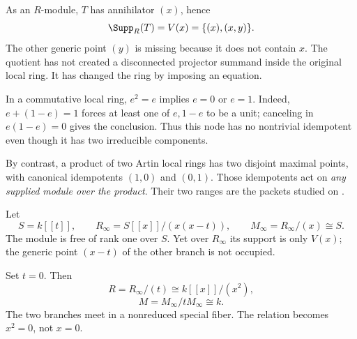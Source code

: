 As an $R$-module, $T$ has annihilator $(x)$, hence
\[
\Supp_R(T)=V(x)=\{(x),(x,y)\}.
\]
The other generic point $(y)$ is missing because it does not contain $x$. The quotient has not created a disconnected projector summand inside the original local ring. It has changed the ring by imposing an equation.

In a commutative local ring, $e^2=e$ implies $e=0$ or $e=1$. Indeed, $e+(1-e)=1$ forces at least one of $e,1-e$ to be a unit; canceling in $e(1-e)=0$ gives the conclusion. Thus this node has no nontrivial idempotent even though it has two irreducible components.

By contrast, a product of two Artin local rings has two disjoint maximal points, with canonical idempotents $(1,0)$ and $(0,1)$. Those idempotents act on \emph{any supplied module over the product}. Their two ranges are the packets studied on .


Let
\[
S=k[[t]],\qquad R_\infty=S[[x]]/(x(x-t)),\qquad
M_\infty=R_\infty/(x)\cong S.
\]
The module is free of rank one over $S$. Yet over $R_\infty$ its support is only $V(x)$; the generic point $(x-t)$ of the other branch is not occupied.

\begin{minipage}[c]{.47\linewidth}
\end{minipage}\hfill
\begin{minipage}[c]{.49\linewidth}
Set $t=0$. Then
\[
R=R_\infty/(t)\cong k[[x]]/(x^2),
\]
\[
M=M_\infty/tM_\infty\cong k.
\]
The two branches meet in a nonreduced special fiber. The relation becomes $x^2=0$, not $x=0$.
\end{minipage}

